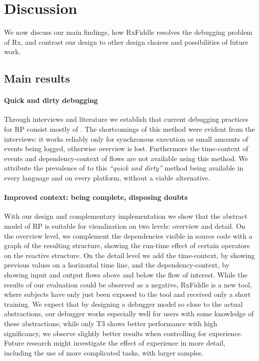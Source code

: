 \section{Discussion} We now discuss our main findings, how RxFiddle
resolves the debugging problem of Rx, and contrast our design to other
design choices and possibilities of future work.

\subsection{Main results}
\paragraph{Quick and dirty debugging} Through interviews and literature
we establish that current debugging practices for RP consist mostly of
\printfdebugging{}.  The shortcomings of this method were evident from
the interviews:  it works reliably only for synchronous execution or
small amounts of events being logged, otherwise overview is lost.
Furthermore the time-context of events and dependency-context of flows
are not available using this method.  We attribute the prevalence of
\printfdebugging{} to this \emph{``quick and dirty''} method being
available in every language and on every platform, without a viable
alternative.

\paragraph{Improved context:  being complete, disposing doubts} With our
design and complementary implementation we show that the abstract model
of RP is suitable for visualization on two levels:  overview and detail.
On the overview level, we complement the dependencies visible in source
code with a graph of the resulting structure, showing the run-time
effect of certain operators on the reactive structure.  On the detail
level we add the time-context, by showing previous values on a
horizontal time line, and the dependency-context, by showing input and
output flows above and below the flow of interest.  While the results of
our evaluation could be observed as a negative, RxFiddle is a new tool,
where subjects have only just been exposed to the tool and received only
a short training.  We expect that by designing a debugger model so close
to the actual abstractions, our debugger works especially well for users
with some knowledge of these abstractions; while only T3 shows better
performance with high significancy, we observe slightly better results
when controlling for experience.  Future research might investigate the
effect of experience in more detail, including the use of more
complicated tasks, with larger samples.

